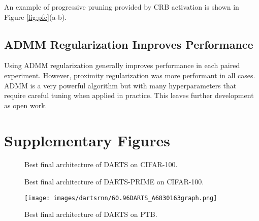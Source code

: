 \documentclass[letterpaper]{article} \usepackage{aaai22}  \usepackage{times}  \usepackage{helvet}  \usepackage{courier}  \usepackage[hyphens]{url}  \usepackage{graphicx} \urlstyle{rm} \def\UrlFont{\rm}  \usepackage{natbib}  \usepackage{caption} \DeclareCaptionStyle{ruled}{labelfont=normalfont,labelsep=colon,strut=off} \frenchspacing  \setlength{\pdfpagewidth}{8.5in}  \setlength{\pdfpageheight}{11in}  \usepackage{algorithm}
\begin{document}
An example of progressive pruning provided by CRB activation is shown in Figure \ref{fig:pfc}(a-b). 

\subsection{ADMM Regularization Improves Performance}

Using ADMM regularization generally improves performance in each paired experiment. However, proximity regularization was more performant in all cases. ADMM is a very powerful algorithm but with many hyperparameters that require careful tuning when applied in practice. This leaves further development as open work.

\section{Supplementary Figures}
\begin{figure}[thp!]
\centering
\begin{minipage}{.39\linewidth}
\centering
{}
\end{minipage}
\begin{minipage}{.59\linewidth}
\centering
{}
\end{minipage}
\caption{Best final architecture of DARTS on CIFAR-100.}
\label{fig:darts100plots}
\end{figure}


\begin{figure}[thp!]
\centering
\begin{minipage}{.49\linewidth}
\centering
{}
\end{minipage}
\begin{minipage}{.49\linewidth}
\centering
{}
\end{minipage}
\caption{Best final architecture of DARTS-PRIME on CIFAR-100.}
\label{fig:prime100plots}
\end{figure}

\begin{figure}[thp!]
\texttt{[image: images/dartsrnn/60.96DARTS\_A6830163graph.png]}
\caption{Best final architecture of DARTS on PTB.} \label{fig:dartsrnn}
\end{figure}
\end{document}
